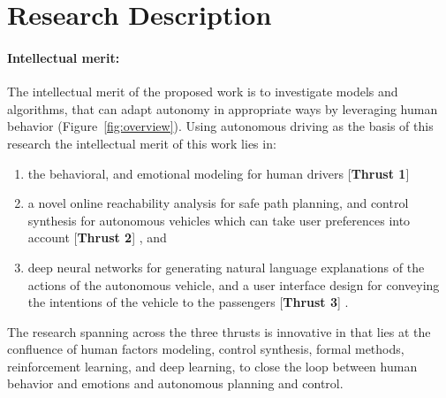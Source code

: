 \section{Research Description}
\label{sec:research}

\paragraph{Intellectual merit:}
\label{sec:im}

The intellectual merit of the proposed work is to investigate models and algorithms, that can adapt autonomy in appropriate ways by leveraging human behavior (Figure~\ref{fig:overview}). Using autonomous driving as the basis of this research the intellectual merit of this work lies in:
\begin{enumerate}[itemsep=0pt,parsep=0pt,topsep=4pt,leftmargin=0.4in]
    \item the behavioral, and emotional modeling for human drivers [\textbf{Thrust 1}]
    \item a novel online reachability analysis for safe path planning, and control synthesis for autonomous vehicles which can take user preferences into account [\textbf{Thrust 2}]  , and
    \item deep neural networks for generating natural language explanations of the actions of the autonomous vehicle, and a user interface design for conveying the intentions of the vehicle to the passengers [\textbf{Thrust 3}] . 
\end{enumerate} 
The research spanning across the three thrusts is innovative in that lies at the confluence of human factors modeling, control synthesis, formal methods, reinforcement learning, and deep learning, to close the loop between human behavior and emotions and autonomous planning and control.






